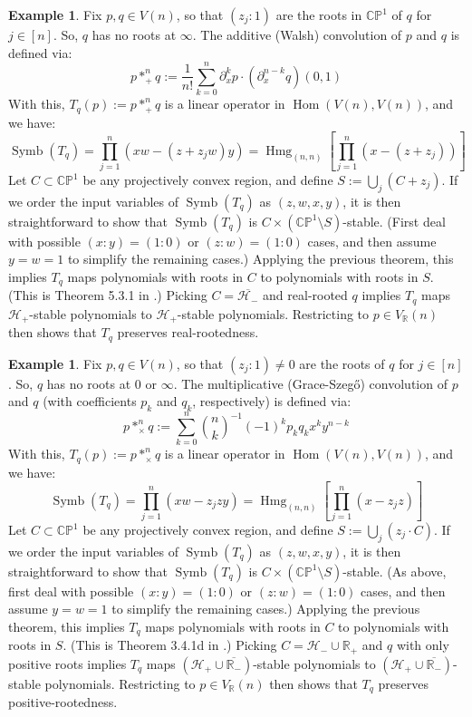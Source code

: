 \documentclass{article}
\theoremstyle{definition}
\newtheorem{example}[theorem]{Example}
\theoremstyle{plain}
\newcommand{\R}{\mathbb{R}}
\newcommand{\CP}{\mathbb{CP}}
\newcommand{\UHP}{\mathcal{H}_+}
\newcommand{\LHP}{\mathcal{H}_-}
\DeclareMathOperator{\Hmg}{Hmg}
\DeclareMathOperator{\Symb}{Symb}
\DeclareMathOperator{\Hom}{Hom}
\begin{document}
\begin{example}\label{add_conv_ex1}
    Fix $p,q \in V(n)$, so that $(z_j:1)$ are the roots in $\CP^1$ of $q$ for $j \in [n]$. So, $q$ has no roots at $\infty$. The additive (Walsh) convolution of $p$ and $q$ is defined via:
    \[
        p *_+^n q := \frac{1}{n!} \sum_{k=0}^n \partial_x^k p \cdot (\partial_x^{n-k} q)(0,1)
    \]
    With this, $T_q(p) := p *_+^n q$ is a linear operator in $\Hom(V(n),V(n))$, and we have:
    \[
        \Symb(T_q) = \prod_{j=1}^n (xw - (z + z_jw)y) = \Hmg_{(n,n)}\left[\prod_{j=1}^n (x - (z + z_j))\right]
    \]
    Let $C \subset \CP^1$ be any projectively convex region, and define $S := \bigcup_j (C + z_j)$. If we order the input variables of $\Symb(T_q)$ as $(z,w,x,y)$, it is then straightforward to show that $\Symb(T_q)$ is $C \times (\CP^1 \setminus S)$-stable. (First deal with possible $(x:y) = (1:0)$ or $(z:w) = (1:0)$ cases, and then assume $y = w = 1$ to simplify the remaining cases.) Applying the previous theorem, this implies $T_q$ maps polynomials with roots in $C$ to polynomials with roots in $S$. (This is Theorem 5.3.1 in \cite{rahman2002anthpoly}.) Picking $C = \overline{\LHP}$ and real-rooted $q$ implies $T_q$ maps $\UHP$-stable polynomials to $\UHP$-stable polynomials. Restricting to $p \in V_\R(n)$ then shows that $T_q$ preserves real-rootedness.
\end{example}

\begin{example}\label{mult_conv_ex1}
    Fix $p,q \in V(n)$, so that $(z_j:1) \neq 0$ are the roots of $q$ for $j \in [n]$. So, $q$ has no roots at $0$ or $\infty$. The multiplicative (Grace-Szeg{\H{o}}) convolution of $p$ and $q$ (with coefficients $p_k$ and $q_k$, respectively) is defined via:
    \[
        p *_\times^n q := \sum_{k=0}^n \binom{n}{k}^{-1} (-1)^k p_k q_k x^k y^{n-k}
    \]
    With this, $T_q(p) := p *_\times^n q$ is a linear operator in $\Hom(V(n),V(n))$, and we have:
    \[
        \Symb(T_q) = \prod_{j=1}^n (xw - z_jzy) = \Hmg_{(n,n)}\left[\prod_{j=1}^n (x - z_j z)\right]
    \]
    Let $C \subset \CP^1$ be any projectively convex region, and define $S := \bigcup_j (z_j \cdot C)$. If we order the input variables of $\Symb(T_q)$ as $(z,w,x,y)$, it is then straightforward to show that $\Symb(T_q)$ is $C \times (\CP^1 \setminus S)$-stable. (As above, first deal with possible $(x:y) = (1:0)$ or $(z:w) = (1:0)$ cases, and then assume $y = w = 1$ to simplify the remaining cases.) Applying the previous theorem, this implies $T_q$ maps polynomials with roots in $C$ to polynomials with roots in $S$. (This is Theorem 3.4.1d in \cite{rahman2002anthpoly}.) Picking $C = \LHP \cup \R_+$ and $q$ with only positive roots implies $T_q$ maps $(\UHP \cup \overline{\R_-})$-stable polynomials to $(\UHP \cup \overline{\R_-})$-stable polynomials. Restricting to $p \in V_\R(n)$ then shows that $T_q$ preserves positive-rootedness.
\end{example}
\end{document}
